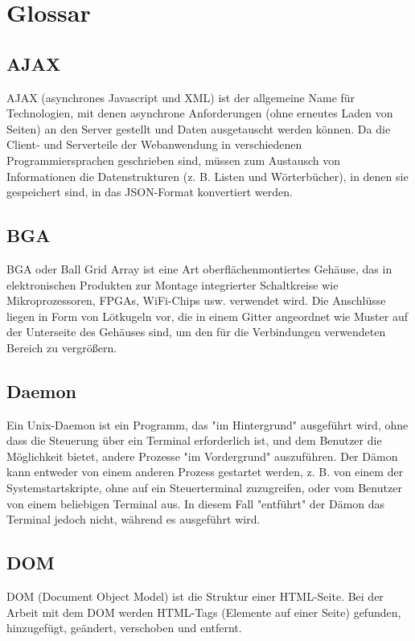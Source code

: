 \clearpage
{}
\chapter*{Glossar}
%
\section*{AJAX}
\label{sec:appendix:ajax}
AJAX (asynchrones Javascript und XML) ist der allgemeine Name für Technologien, mit denen asynchrone Anforderungen (ohne erneutes Laden von Seiten) an den Server gestellt und Daten ausgetauscht werden können. Da die Client- und Serverteile der Webanwendung in verschiedenen Programmiersprachen geschrieben sind, müssen zum Austausch von Informationen die Datenstrukturen (z. B. Listen und Wörterbücher), in denen sie gespeichert sind, in das JSON-Format konvertiert werden.

\section*{BGA}
\label{sec:appendix:bga}
BGA oder Ball Grid Array ist eine Art oberflächenmontiertes Gehäuse, das in elektronischen Produkten zur Montage integrierter Schaltkreise wie Mikroprozessoren, FPGAs, WiFi-Chips usw. verwendet wird. Die Anschlüsse liegen in Form von Lötkugeln vor, die in einem Gitter angeordnet wie Muster auf der Unterseite des Gehäuses sind, um den für die Verbindungen verwendeten Bereich zu vergrößern.

\section*{Daemon}
\label{sec:appendix:daemon}
Ein Unix-Daemon ist ein Programm, das "im Hintergrund" ausgeführt wird, ohne dass die Steuerung über ein Terminal erforderlich ist, und dem Benutzer die Möglichkeit bietet, andere Prozesse "im Vordergrund" auszuführen. Der Dämon kann entweder von einem anderen Prozess gestartet werden, z. B. von einem der Systemstartskripte, ohne auf ein Steuerterminal zuzugreifen, oder vom Benutzer von einem beliebigen Terminal aus. In diesem Fall "entführt" der Dämon das Terminal jedoch nicht, während es ausgeführt wird.

\section*{DOM}
\label{sec:appendix:dom}
DOM (Document Object Model) ist die Struktur einer HTML-Seite. Bei der Arbeit mit dem DOM werden HTML-Tags (Elemente auf einer Seite) gefunden, hinzugefügt, geändert, verschoben und entfernt.

